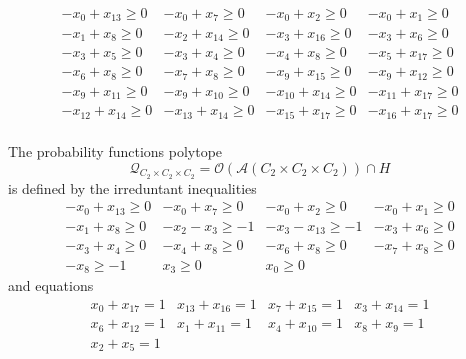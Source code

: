 \documentclass[11pt,a4paper,abstract=yes]{scrartcl}
\theoremstyle{plain}
\newcommand{\prpolytope}[1]{\mathcal{Q}_{#1}}
\newcommand{\orderpolytope}[1]{\mathcal{O}({#1})}
\newcommand{\twoanti}[1]{\mathcal{A}({#1})}
\begin{document}
\begin{mexample}
\label{}
\begin{displaymath}\begin{array}{cccc}
-x_{0} + x_{13} \geq 0
 &
-x_{0} + x_{7} \geq 0
 &
-x_{0} + x_{2} \geq 0
 &
-x_{0} + x_{1} \geq 0
 \\
-x_{1} + x_{8} \geq 0
 &
-x_{2} + x_{14} \geq 0
 &
-x_{3} + x_{16} \geq 0
 &
-x_{3} + x_{6} \geq 0
 \\
-x_{3} + x_{5} \geq 0
 &
-x_{3} + x_{4} \geq 0
 &
-x_{4} + x_{8} \geq 0
 &
-x_{5} + x_{17} \geq 0
 \\
-x_{6} + x_{8} \geq 0
 &
-x_{7} + x_{8} \geq 0
 &
-x_{9} + x_{15} \geq 0
 &
-x_{9} + x_{12} \geq 0
 \\
-x_{9} + x_{11} \geq 0
 &
-x_{9} + x_{10} \geq 0
 &
-x_{10} + x_{14} \geq 0
 &
-x_{11} + x_{17} \geq 0
 \\
-x_{12} + x_{14} \geq 0
 &
-x_{13} + x_{14} \geq 0
 &
-x_{15} + x_{17} \geq 0
 &
-x_{16} + x_{17} \geq 0
 \\
\end{array}\end{displaymath}

The probability functions polytope
\[\prpolytope{C_{2} \times C_{2} \times C_{2}} = \orderpolytope{\twoanti{C_{2} \times C_{2} \times C_{2}}} \cap H\]
is defined by the irreduntant inequalities
\label{}
\begin{displaymath}\begin{array}{cccc}
-x_{0} + x_{13} \geq 0
 &
-x_{0} + x_{7} \geq 0
 &
-x_{0} + x_{2} \geq 0
 &
-x_{0} + x_{1} \geq 0
 \\
-x_{1} + x_{8} \geq 0
 &
-x_{2} - x_{3} \geq -1
 &
-x_{3} - x_{13} \geq -1
 &
-x_{3} + x_{6} \geq 0
 \\
-x_{3} + x_{4} \geq 0
 &
-x_{4} + x_{8} \geq 0
 &
-x_{6} + x_{8} \geq 0
 &
-x_{7} + x_{8} \geq 0
 \\
-x_{8} \geq -1
 &
x_{3} \geq 0
 &
x_{0} \geq 0
 &
\end{array}\end{displaymath}
and equations
\label{}
\begin{displaymath}\begin{array}{cccc}
x_{0} + x_{17} = 1
 &
x_{13} + x_{16} = 1
 &
x_{7} + x_{15} = 1
 &
x_{3} + x_{14} = 1
 \\
x_{6} + x_{12} = 1
 &
x_{1} + x_{11} = 1
 &
x_{4} + x_{10} = 1
 &
x_{8} + x_{9} = 1
 \\
x_{2} + x_{5} = 1
 &
\end{array}\end{displaymath}


\end{mexample}
\end{document}
